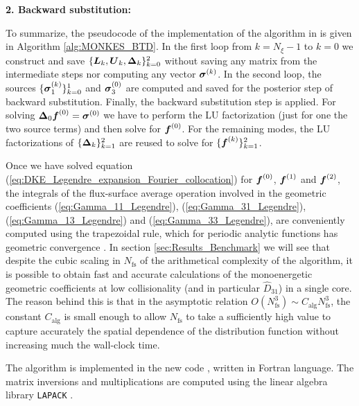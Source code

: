 \begin{algorithm}
\begin{algorithmic}
		\EndFor
		
		
		
		\State{}
	\end{algorithmic}
	
	\textbf{2. Backward substitution:}
	\begin{algorithmic}%
		\EndFor
	\end{algorithmic}
\end{algorithm}


To summarize, the pseudocode of the implementation of the algorithm in {\MONKES} is given in Algorithm \ref{alg:MONKES_BTD}. In the first loop from $k=N_\xi-1$ to $k=0$ we construct and save $\{\vb*{L}_k,\vb*{U}_k, \vb*{\Delta}_k\}_{k=0}^{2}$ without saving any matrix from the intermediate steps nor computing any vector $\vb*{\sigma}^{(k)}$. In the second loop, the sources $\{\vb*{\sigma}_1^{(k)}\}_{k=0}^{1}$ and $\vb*{\sigma}_3^{(0)}$ are computed and saved for the posterior step of backward substitution. Finally, the backward substitution step is applied. For solving $\vb*{\Delta}_0 \vb*{f}^{(0)} = \vb*{\sigma}^{(0)}$ we have to perform the LU factorization (just for one the two source terms) and then solve for $\vb*{f}^{(0)}$. For the remaining modes, the LU factorizations of $\{\vb*{\Delta}_k\}_{k=1}^{2}$ are reused to solve for $\{\vb*{f}^{(k)}\}_{k=1}^{2}$.

Once we have solved equation (\ref{eq:DKE_Legendre_expansion_Fourier_collocation}) for $\vb*{f}^{(0)}$, $\vb*{f}^{(1)}$ and $\vb*{f}^{(2)}$, the integrals of the flux-surface average operation involved in the geometric coefficients (\ref{eq:Gamma_11_Legendre}), (\ref{eq:Gamma_31_Legendre}), (\ref{eq:Gamma_13_Legendre}) and (\ref{eq:Gamma_33_Legendre}), are conveniently computed using the trapezoidal rule, which for periodic analytic functions has geometric convergence \cite{Trapezoidal}. In section \ref{sec:Results_Benchmark} we will see that despite the cubic scaling in $N_{\text{fs}}$ of the arithmetical complexity of the algorithm, it is possible to obtain fast and accurate calculations of the monoenergetic geometric coefficients at low collisionality (and in particular $\widehat{D}_{31}$) in a single core. The reason behind this is that in the asymptotic relation $O(N_{\text{fs}}^3)\sim C_{\text{alg}} N_{\text{fs}}^3$, the constant $C_{\text{alg}}$ is small enough to allow $N_{\text{fs}}$ to take a sufficiently high value to capture accurately the spatial dependence of the distribution function without increasing much the wall-clock time. 

The algorithm is implemented in the new code {\MONKES}, written in Fortran language. The matrix inversions and multiplications are computed using the linear algebra library \texttt{LAPACK} \cite{lapack99}.